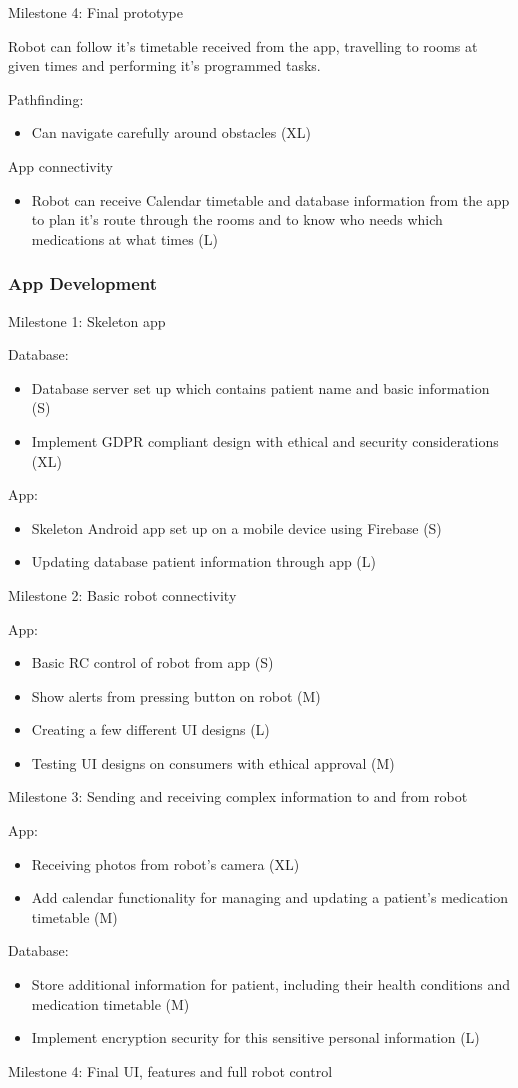 \documentclass{article}
\begin{document}
Milestone 4: Final prototype

Robot can follow it's timetable received from the app, travelling to rooms at given times and performing it's programmed tasks.

Pathfinding:
\begin{itemize}
\item Can navigate carefully around obstacles (XL)
\end{itemize}
App connectivity 
\begin{itemize}
\item Robot can receive Calendar timetable and database information from the app to plan it's route through the rooms and to know who         needs which medications at what times (L)
\end{itemize}
    
\subsubsection{App Development}

Milestone 1: Skeleton app

Database:
\begin{itemize}
\item Database server set up which contains patient name and basic information (S)
\item Implement GDPR compliant design with ethical and security considerations  (XL)
\end{itemize}
    
App:
\begin{itemize}
\item Skeleton Android app set up on a mobile device using Firebase (S)
\item Updating database patient information through app (L)
\end{itemize}    
Milestone 2: Basic robot connectivity

App:
\begin{itemize}
\item Basic RC control of robot from app (S)
\item Show alerts from pressing button on robot (M)
\item Creating a few different UI designs (L)
\item Testing UI designs on consumers with ethical approval (M)
\end{itemize}
Milestone 3: Sending and receiving complex information to and from robot

App:
\begin{itemize}
\item Receiving photos from robot's camera (XL)
\item Add calendar functionality for managing and updating a patient's medication timetable (M)
\end{itemize}
Database:
\begin{itemize}
\item Store additional information for patient, including their health conditions and medication timetable (M)
\item Implement encryption security for this sensitive personal information (L)
\end{itemize}
Milestone 4: Final UI, features and full robot control
\end{document}
